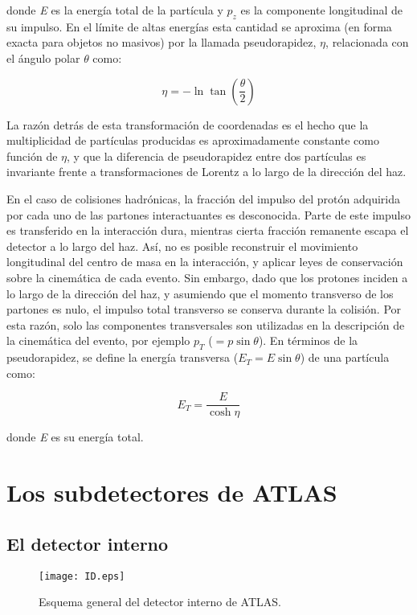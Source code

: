 donde \textit{E} es la energía total de la partícula y $p_{z}$ es la componente longitudinal de su impulso. En el límite de altas energías esta cantidad se aproxima (en forma exacta para objetos no masivos) por la llamada pseudorapidez, $\eta$, relacionada con el ángulo polar $\theta$ como:

\begin{equation}
\eta =-\ln \tan\left( \frac{\theta}{2} \right)
\end{equation}

La razón detrás de esta transformación de coordenadas es el hecho que la multiplicidad de partículas producidas es aproximadamente constante como función de $\eta$, y que la diferencia de pseudorapidez entre dos partículas es invariante frente a transformaciones de Lorentz a lo largo de la dirección del haz. 

En el caso de colisiones hadrónicas, la fracción del impulso del protón adquirida por cada uno de las partones interactuantes es desconocida. Parte de este impulso es transferido en la interacción dura, mientras cierta fracción remanente escapa el detector a lo largo del haz. Así, no es posible reconstruir el movimiento longitudinal del centro de masa en la interacción, y aplicar leyes de conservación sobre la cinemática de cada evento. Sin embargo, dado que los protones inciden a lo largo de la dirección del haz, y asumiendo que el momento transverso de los partones es nulo, el impulso total transverso se conserva durante la colisión. Por esta razón, solo las componentes transversales son utilizadas en la descripción de la cinemática del evento, por ejemplo $p_{T}$ ($=p\sin\theta$). En términos de la pseudorapidez, se define la energía transversa ($E_{T}=E\sin\theta$) de una partícula como:

\begin{equation}
E_{T}=\frac{E}{\cosh \eta}
\end{equation}

donde \textit{E} es su energía total.

\section{Los subdetectores de ATLAS}

\subsection{El detector interno}

\begin{figure}
\centering
\texttt{[image: ID.eps]}
\caption{Esquema general del detector interno de ATLAS.}
\label{ID}
\end{figure}


